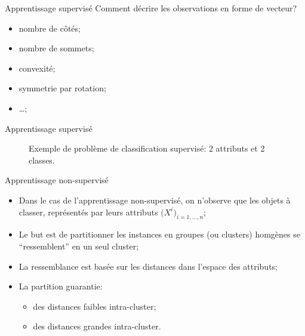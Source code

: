 \documentclass[8pt]{beamer}
\begin{document}
			\begin{frame}{Apprentissage supervisé}
				Comment décrire les observations en forme de vecteur?
				\begin{itemize}
					\item<2-> nombre de côtés;
					\item<3-> nombre de sommets;
					\item<4-> convexité;
					\item<5-> symmetrie par rotation;
					\item<6-> \dots;
				\end{itemize}
			\end{frame}

			\begin{frame}{Apprentissage supervisé}
				\begin{figure}[H]
					\begin{center}
						
						\caption*{\tiny Exemple de problème de classification supervisé: 2 attributs et 2 classes.}
					\end{center}
				\end{figure}
			\end{frame}

			\begin{frame}{Apprentissage non-supervisé}
				\begin{itemize}
					\item<1-> Dans le cas de l'apprentissage non-supervisé, on n'observe que les objets à classer, représentés par leurs attributs \(\big(X^i\big)_{i=1,\dots, n}\);
					\item<2-> Le but est de partitionner les instances en groupes (ou clusters) homgènes se ``ressemblent'' en un seul cluster;
					\item<3-> La ressemblance est basée sur les distances dans l'espace des attributs;
					\item<4-> La partition guarantie:
						\begin{itemize}
							\item<5-> des distances faibles intra-cluster;
							\item<6-> des distances grandes intra-cluster.
						\end{itemize}
				\end{itemize}
			\end{frame}
\end{document}

